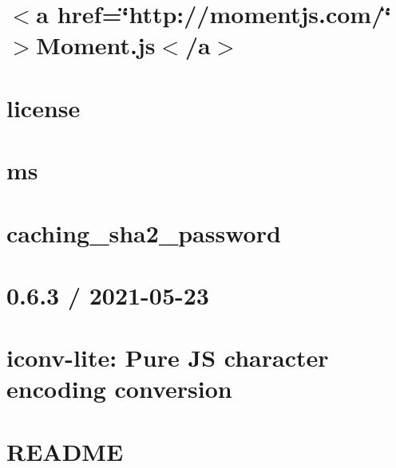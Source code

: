 \documentclass[twoside]{book}
\newcommand{\+}{\discretionary{\mbox{\scriptsize$\hookleftarrow$}}{}{}}
\begin{document}
\chapter{\texorpdfstring{$<$}{<}a href=\char`\"{}http\+://momentjs.\+com/\char`\"{} \texorpdfstring{$>$}{>}Moment.\+js\texorpdfstring{$<$}{<}/a\texorpdfstring{$>$}{>}}
\label{md_src_nodejs_node_modules_moment_README}

\chapter{license}
\label{md_src_nodejs_node_modules_ms_license}

\chapter{ms}
\label{md_src_nodejs_node_modules_ms_readme}

\chapter{caching\+\_\+sha2\+\_\+password}
\label{md_src_nodejs_node_modules_mysql2_lib_auth_plugins_caching_sha2_password}

\chapter{0.6.3 / 2021-\/05-\/23}
\label{md_src_nodejs_node_modules_mysql2_node_modules_iconv_lite_Changelog}

\chapter{iconv-\/lite\+: Pure JS character encoding conversion}
\label{md_src_nodejs_node_modules_mysql2_node_modules_iconv_lite_README}

\chapter{README}
\label{md_src_nodejs_node_modules_mysql2_README}

\end{document}
